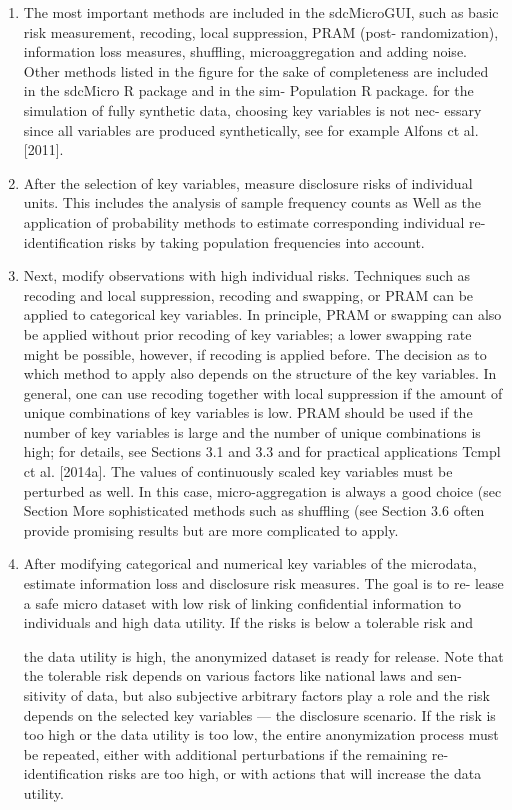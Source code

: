 \documentclass[]{article}
\begin{document}
\begin{enumerate}
\item The most important methods are included in the sdcMicroGUI, such
as basic risk measurement, recoding, local suppression, PRAM (post-
randomization), information loss measures, shuffling, microaggregation
and adding noise. Other methods listed in the ﬁgure for the sake of
completeness are included in the sdcMicro R package and in the sim-
Population R package.
for the simulation of fully synthetic data, choosing key variables is not nec-
essary since all variables are produced synthetically, see for example Alfons
ct al. [2011].
\item After the selection of key variables, measure disclosure risks of individual
units. This includes the analysis of sample frequency counts as Well as the
application of probability methods to estimate corresponding individual re-
identiﬁcation risks by taking population frequencies into account.
\item Next, modify observations with high individual risks. Techniques such as
recoding and local suppression, recoding and swapping, or PRAM can be
applied to categorical key variables. In principle, PRAM or swapping can
also be applied without prior recoding of key variables; a lower swapping rate
might be possible, however, if recoding is applied before. The decision as to
which method to apply also depends on the structure of the key variables. In
general, one can use recoding together with local suppression if the amount
of unique combinations of key variables is low. PRAM should be used if
the number of key variables is large and the number of unique combinations
is high; for details, see Sections 3.1 and 3.3 and for practical applications
Tcmpl ct al. [2014a]. The values of continuously scaled key variables must be
perturbed as well. In this case, micro-aggregation is always a good choice (sec
Section  More sophisticated methods such as shuffling (see Section 3.6
often provide promising results but are more complicated to apply.
\item  After modifying categorical and numerical key variables of the microdata,
estimate information loss and disclosure risk measures. The goal is to re-
lease a safe micro dataset with low risk of linking conﬁdential information
to individuals and high data utility. If the risks is below a tolerable risk and

the data utility is high, the anonymized dataset is ready for release. Note
that the tolerable risk depends on various factors like national laws and sen-
sitivity of data, but also subjective arbitrary factors play a role and the risk
depends on the selected key variables — the disclosure scenario. If the risk
is too high or the data utility is too low, the entire anonymization process
must be repeated, either with additional perturbations if the remaining re-
identiﬁcation risks are too high, or with actions that will increase the data
utility.
\end{enumerate}
\end{document}
